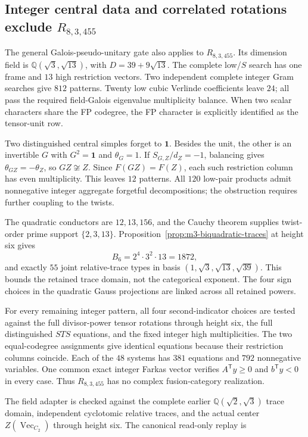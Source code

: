 \subsection{Integer central data and correlated rotations exclude \texorpdfstring{$R_{8,3,455}$}{R8,3,455}}
\label{subsec:r455-integer-rotation}

The general Galois-pseudo-unitary gate also applies to $R_{8,3,455}$.
Its dimension field is $\mathbb Q(\sqrt3,\sqrt{13})$, with
$D=39+9\sqrt{13}$.  The complete low/$S$ search has one frame and
$13$ high restriction vectors.  Two independent complete integer Gram
searches give $812$ patterns.  Twenty low cubic Verlinde coefficients
leave $24$; all pass the required field-Galois eigenvalue multiplicity
balance.  When two scalar characters share the FP codegree, the FP
character is explicitly identified as the tensor-unit row.

Two distinguished central simples forget to $\mathbf1$.  Besides the
unit, the other is an invertible $G$ with $G^2=\mathbf1$ and
$\theta_G=1$.  If $S_{G,Z}/d_Z=-1$, balancing gives
$\theta_{GZ}=-\theta_Z$, so $GZ\not\cong Z$.  Since $F(GZ)=F(Z)$,
each such restriction column has even multiplicity.  This leaves
$12$ patterns.  All $120$ low-pair products admit nonnegative integer
aggregate forgetful decompositions; the obstruction requires further
coupling to the twists.

The quadratic conductors are $12,13,156$, and the Cauchy theorem
\cite{BNRWCauchy} supplies twist-order prime support $\{2,3,13\}$.
Proposition~\ref{prop:m3-biquadratic-traces} at height six gives
\[
 B_6=2^4\cdot3^2\cdot13=1872,
\]
and exactly $55$ joint relative-trace types in basis
$(1,\sqrt3,\sqrt{13},\sqrt{39})$.
This bounds the retained trace domain, not the categorical exponent.
The four sign choices in the quadratic Gauss projections are linked
across all retained powers.

For every remaining integer pattern, all four second-indicator choices
are tested against the full divisor-power tensor rotations through
height six, the full distinguished $STS$ equations, and the fixed
integer high multiplicities.  The two equal-codegree assignments give
identical equations because their restriction columns coincide.
Each of the $48$ systems has $381$ equations and $792$ nonnegative
variables.  One common exact integer Farkas vector verifies
$A^{\mathsf T}y\geq0$ and $b^{\mathsf T}y<0$ in every case.
Thus $R_{8,3,455}$ has no complex fusion-category realization.

The field adapter is checked against the complete earlier
$\mathbb Q(\sqrt2,\sqrt3)$ trace domain, independent cyclotomic relative
traces, and the actual center $Z(\operatorname{Vec}_{C_2})$ through
height six.  The canonical read-only replay is
\begin{quote}\small{}\end{quote}
